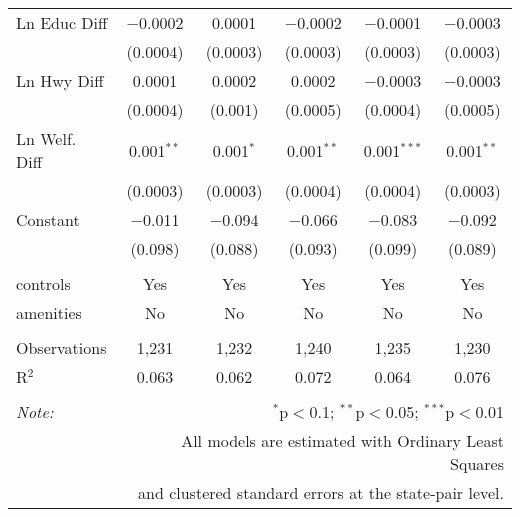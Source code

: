 \begin{table}[!htbp]
\begin{tabular}{@{\extracolsep{5pt}}lccccc}
  Ln Educ Diff & $-$0.0002 & 0.0001 & $-$0.0002 & $-$0.0001 & $-$0.0003 \\ 
  & (0.0004) & (0.0003) & (0.0003) & (0.0003) & (0.0003) \\ 
  Ln Hwy Diff & 0.0001 & 0.0002 & 0.0002 & $-$0.0003 & $-$0.0003 \\ 
  & (0.0004) & (0.001) & (0.0005) & (0.0004) & (0.0005) \\ 
  Ln Welf. Diff & 0.001$^{**}$ & 0.001$^{*}$ & 0.001$^{**}$ & 0.001$^{***}$ & 0.001$^{**}$ \\ 
  & (0.0003) & (0.0003) & (0.0004) & (0.0004) & (0.0003) \\ 
  Constant & $-$0.011 & $-$0.094 & $-$0.066 & $-$0.083 & $-$0.092 \\ 
  & (0.098) & (0.088) & (0.093) & (0.099) & (0.089) \\ 
 \hline \\[-1.8ex] 
controls & Yes & Yes & Yes & Yes & Yes \\ 
amenities & No & No & No & No & No \\ 
\hline \\[-1.8ex] 
Observations & 1,231 & 1,232 & 1,240 & 1,235 & 1,230 \\ 
R$^{2}$ & 0.063 & 0.062 & 0.072 & 0.064 & 0.076 \\ 
\hline 
\hline \\[-1.8ex] 
\textit{Note:}  & \multicolumn{5}{r}{$^{*}$p$<$0.1; $^{**}$p$<$0.05; $^{***}$p$<$0.01} \\ 
 & \multicolumn{5}{r}{All models are estimated with Ordinary Least Squares} \\ 
 & \multicolumn{5}{r}{and clustered standard errors at the state-pair level.} \\ 
\end{tabular} 
\end{table} 
